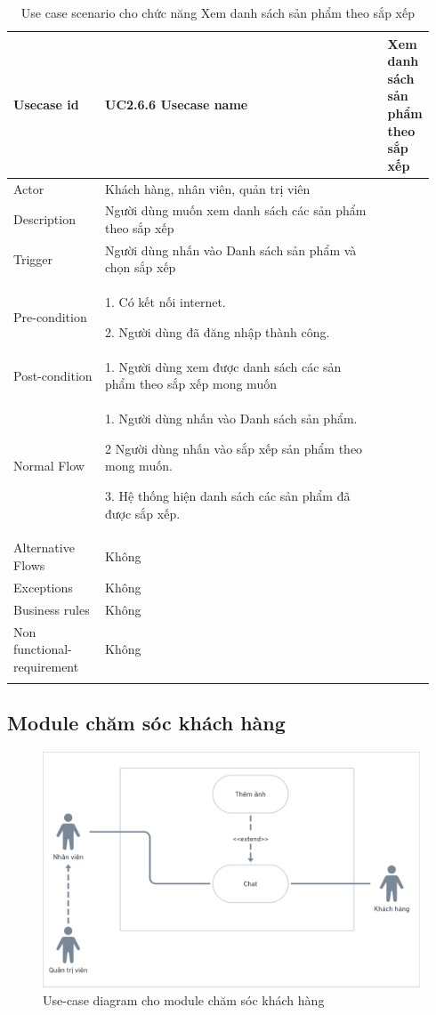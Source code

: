 \begin{longtable}{|>{\hspace{0pt}}m{0.229\linewidth}|>{\hspace{0pt}}m{0.713\linewidth}|} 
\hline
Usecase id & UC2.6.6 \endfirsthead 
\hline
Usecase name & Xem danh sách sản phẩm theo sắp xếp \\ 
\hline
Actor & Khách hàng, nhân viên, quản trị viên \\ 
\hline
Description & Người dùng muốn xem danh sách các sản phẩm theo sắp xếp\\ 
\hline
Trigger & Người dùng nhấn vào Danh sách sản phẩm và chọn sắp xếp  \\ 
\hline
Pre-condition & 1. Có kết nối internet.\par{}2. Người dùng đã đăng nhập thành công. \\ 
\hline
Post-condition & 1. Người dùng xem được danh sách các sản phẩm theo sắp xếp mong muốn \\
\hline
Normal Flow & 1. Người dùng nhấn vào Danh sách sản phẩm.\par{}2 Người dùng nhấn vào sắp xếp sản phẩm theo mong muốn.\par{} 3. Hệ thống hiện danh sách các sản phẩm đã được sắp xếp. \\
\hline
Alternative Flows & Không~ \\ 
\hline
Exceptions & Không \\ 
\hline
Business rules & Không \\ 
\hline
Non functional-requirement & Không \\ 
\hline
\caption{Use case scenario cho chức năng Xem danh sách sản phẩm theo sắp xếp}

\end{longtable}

\newpage
\subsection{Module chăm sóc khách hàng}
\begin{figure}[h]
    \centering
    \includegraphics[scale = 0.2]{img/mod/chatcskh.png}
    \vspace{1cm}
    \caption{Use-case diagram cho module chăm sóc khách hàng}
    \label{fig:taskAssignment}
\end{figure}

